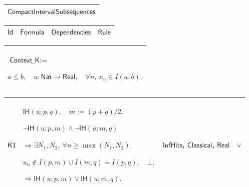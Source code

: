 \documentclass[11pt]{amsart}
\renewcommand{\arraystretch}{1.4}
\newlength{\FTCOneColumnBody}
\newlength{\FTCFourColumnBody}
\begin{document}
{\centering
\renewcommand{\arraystretch}{1.4}
\par\setlength{\parskip}{0pt}\nointerlineskip
\noindent
\begin{tabular}{|@{}>{\centering\arraybackslash}m{\FTCOneColumnBody}|}\hline
$\displaystyle \textsf{CompactIntervalSubsequences}$\\ \hline
\end{tabular}%
\par\setlength{\parskip}{0pt}\nointerlineskip
\noindent
\begin{tabular}{|@{}>{\centering\arraybackslash}m{0.078431\FTCFourColumnBody}|>{\centering\arraybackslash}m{0.535947\FTCFourColumnBody}|>{\centering\arraybackslash}m{0.281045\FTCFourColumnBody}|>{\centering\arraybackslash}m{0.104575\FTCFourColumnBody}|}\hline
$\displaystyle \textsf{Id}$ & $\displaystyle \textsf{Formula}$ & $\displaystyle \textsf{Dependencies}$ & $\displaystyle \textsf{Rule}$\\ \hline
\end{tabular}%
\par\setlength{\parskip}{0pt}\nointerlineskip
\noindent
\begin{tabular}{|@{}>{\centering\arraybackslash}m{\FTCOneColumnBody}|}\hline
$\displaystyle \textsf{Context\_K}:=$\par
$\displaystyle a\le b,\quad u:\textsf{Nat}\to\textsf{Real},\quad\forall n,\ u_n\in I(a,b).$\\ \hline
\end{tabular}%
\par\setlength{\parskip}{0pt}\nointerlineskip
\noindent
\begin{tabular}{|@{}>{\centering\arraybackslash}m{0.078431\FTCFourColumnBody}|>{\centering\arraybackslash}m{0.535947\FTCFourColumnBody}|>{\centering\arraybackslash}m{0.281045\FTCFourColumnBody}|>{\centering\arraybackslash}m{0.104575\FTCFourColumnBody}|}\hline
\hypertarget{proof:K1}{$\displaystyle \textsf{K1}$} & $\displaystyle \textsf{IH}(u;p,q),\quad m:=(p+q)/2,$\par
$\displaystyle \neg\textsf{IH}(u;p,m)\land\neg\textsf{IH}(u;m,q)$\par
$\displaystyle \Rightarrow\exists N_1,N_2,\ \forall n\ge\max(N_1,N_2),$\par
$\displaystyle u_n\notin I(p,m)\cup I(m,q)=I(p,q),\quad\bot,$\par
$\displaystyle \Rightarrow\textsf{IH}(u;p,m)\lor\textsf{IH}(u;m,q).$ & \hyperlink{def:InfHits}{$\displaystyle \textsf{InfHits}$}, \hyperlink{ax:Classical}{$\displaystyle \textsf{Classical}$}, \hyperlink{ax:Real}{$\displaystyle \textsf{Real}$} & $\displaystyle \lor$\\ \hline

\end{tabular}}
\end{document}
